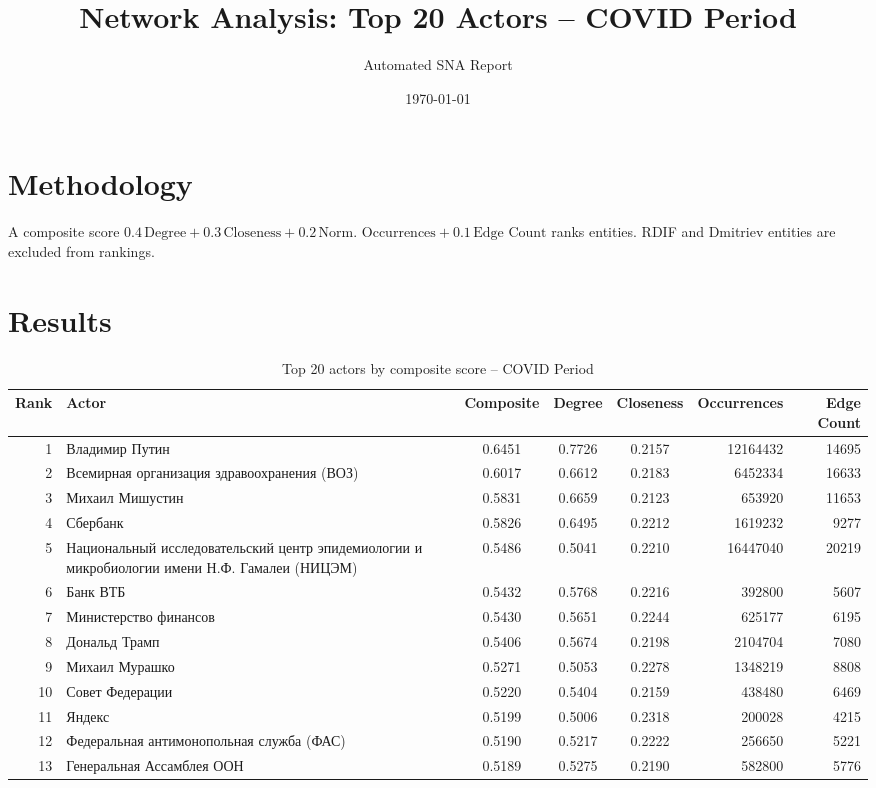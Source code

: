 \documentclass[11pt,a4paper]{article}
\title{Network Analysis: Top 20 Actors -- COVID Period}
\author{Automated SNA Report}
\date{\today}
\begin{document}
\maketitle
\section{Methodology}
A composite score $0.4\,\text{Degree}+0.3\,\text{Closeness}+0.2\,\text{Norm.\ Occurrences}+0.1\,\text{Edge Count}$ ranks entities. RDIF and Dmitriev entities are excluded from rankings.
\section{Results}
\begin{table}[htbp]
\centering
\caption{Top 20 actors by composite score -- COVID Period}
\label{tab:top20}
\begin{tabular}{r l S[table-format=1.4] S[table-format=1.4] S[table-format=1.4] r r}
\toprule
Rank & Actor & {Composite} & {Degree} & {Closeness} & Occurrences & {Edge Count}\\
 & Владимир Путин & 0.6451 & 0.7726 & 0.2157 & 12164432 & 14695 \\
2 & Всемирная организация здравоохранения (ВОЗ) & 0.6017 & 0.6612 & 0.2183 & 6452334 & 16633 \\
3 & Михаил Мишустин & 0.5831 & 0.6659 & 0.2123 & 653920 & 11653 \\
4 & Сбербанк & 0.5826 & 0.6495 & 0.2212 & 1619232 & 9277 \\
5 & Национальный исследовательский центр эпидемиологии и микробиологии имени Н.Ф. Гамалеи (НИЦЭМ) & 0.5486 & 0.5041 & 0.2210 & 16447040 & 20219 \\
6 & Банк ВТБ & 0.5432 & 0.5768 & 0.2216 & 392800 & 5607 \\
7 & Министерство финансов & 0.5430 & 0.5651 & 0.2244 & 625177 & 6195 \\
8 & Дональд Трамп & 0.5406 & 0.5674 & 0.2198 & 2104704 & 7080 \\
9 & Михаил Мурашко & 0.5271 & 0.5053 & 0.2278 & 1348219 & 8808 \\
10 & Совет Федерации & 0.5220 & 0.5404 & 0.2159 & 438480 & 6469 \\
11 & Яндекс & 0.5199 & 0.5006 & 0.2318 & 200028 & 4215 \\
12 & Федеральная антимонопольная служба (ФАС) & 0.5190 & 0.5217 & 0.2222 & 256650 & 5221 \\
13 & Генеральная Ассамблея ООН & 0.5189 & 0.5275 & 0.2190 & 582800 & 5776 \\

\end{tabular}
\end{table}
\end{document}
